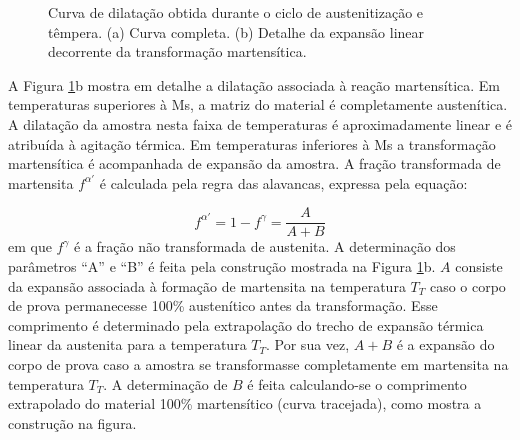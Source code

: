 \begin{figure}
  \vspace{0pt}
  \caption{Curva de dilatação obtida durante o ciclo de austenitização e têmpera. (a) Curva completa. (b) Detalhe da expansão linear decorrente da transformação martensítica.}
  \label{fig:dil_martensita}
\end{figure}

A Figura \ref{fig:dil_martensita}b mostra em detalhe a dilatação associada à reação martensítica. Em temperaturas superiores à Ms, a matriz do material é completamente austenítica. A dilatação da amostra nesta faixa de temperaturas é aproximadamente linear e é atribuída à agitação térmica. Em temperaturas inferiores à Ms a transformação martensítica é acompanhada de expansão da amostra. A fração transformada de martensita $f^{\alpha'}$ é calculada pela regra das alavancas, expressa pela equação:

\begin{equation}
  f^{\alpha'} = 1 - f^\gamma = \frac{A}{A + B}
  \label{eq:alavanca}
\end{equation}
%
em que $f^\gamma$ é a fração não transformada de austenita. A determinação dos parâmetros ``A'' e ``B'' é feita pela construção mostrada na Figura \ref{fig:dil_martensita}b. $A$ consiste da expansão associada à formação de martensita na temperatura $T_T$ caso o corpo de prova permanecesse 100\% austenítico antes da transformação. Esse comprimento é determinado pela extrapolação do trecho de expansão térmica linear da austenita para a temperatura $T_T$. Por sua vez, $A + B$ é a expansão do corpo de prova caso a amostra se transformasse completamente em martensita na temperatura $T_T$. A determinação de $B$ é feita calculando-se o comprimento extrapolado do material 100\% martensítico (curva tracejada), como mostra a construção na figura.

